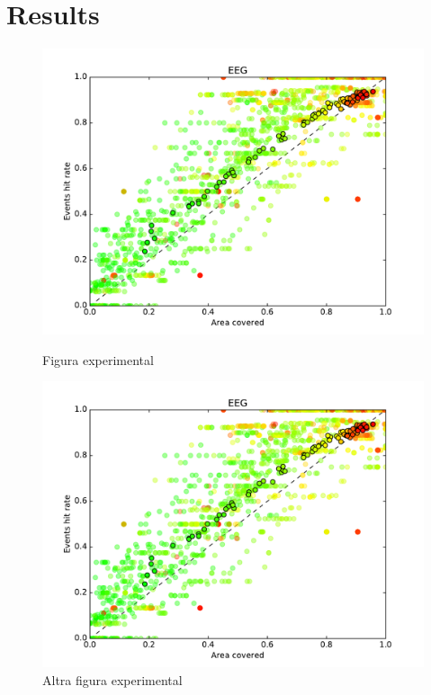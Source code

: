 \section{Results}

\begin{figure}[h!]
  \begin{minipage}[t]{0.5\textwidth}
    \includegraphics[width=\linewidth,keepaspectratio=true]{graphics/graphs/short/area_covered-events_hit_rate-CovNu-EEG.pdf}
    \caption{Figura experimental}
    \label{fase1}
  \end{minipage}
  \hspace*{\fill} %
  \begin{minipage}[t]{0.5\textwidth}
    \includegraphics[width=\linewidth,keepaspectratio=true]{graphics/graphs/short/area_covered-events_hit_rate-CovNu-EEG.pdf}
    \caption{Altra figura experimental}
    \label{fase2}
  \end{minipage}
\end{figure}

